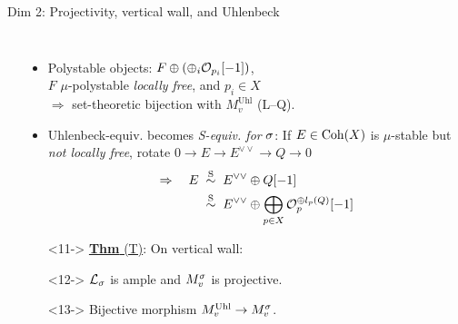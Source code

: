 \documentclass[8pt]{beamer} %
\begin{document}
\begin{frame}[fragile]{Dim 2: Projectivity, vertical wall, and Uhlenbeck}
\begin{columns}[t]
\begin{itemize}
\begin{center}
        \end{center}
        \end{itemize}
                
        \begin{itemize}
            \item<9-> Polystable objects: $F \oplus (\oplus_i \mathcal{O}_{p_i}[-1])$, \\ $F$ $\mu$-polystable \textit{locally free}, and $p_i \in X$ \\ $\Rightarrow$ set-theoretic bijection with $M^{\text{Uhl}}_v$ (L--Q).
            \item<10-> Uhlenbeck-equiv. becomes \textit{S-equiv. for} $\sigma$: If $E \in \mathrm{Coh}(X)$ is $\mu$-stable but \textit{not locally free}, rotate $0 \to E \to E^{\vee\vee} \to Q \to 0$
            \begin{align*}
                \Rightarrow \quad E \; & \overset{\text{S}}{\sim} \; E^{\vee\vee} \oplus Q[-1] \\
                & \overset{\text{S}}{\sim} \; E^{\vee\vee} \oplus \bigoplus_{p \in X} \mathcal{O}_p^{\oplus l_p(Q)}[-1]
            \end{align*} 
            \item[]<11-> \underline{\textbf{Thm} (T)}: On vertical wall:
                \item[]<12-> $\mathcal{L}_\sigma$ is ample and $M^\sigma_v$ is projective.
                \item[]<13-> Bijective morphism $M^{\text{Uhl}}_v \to M^\sigma_v$.
            

\end{itemize}
\end{columns}
\end{frame}
\end{document}
